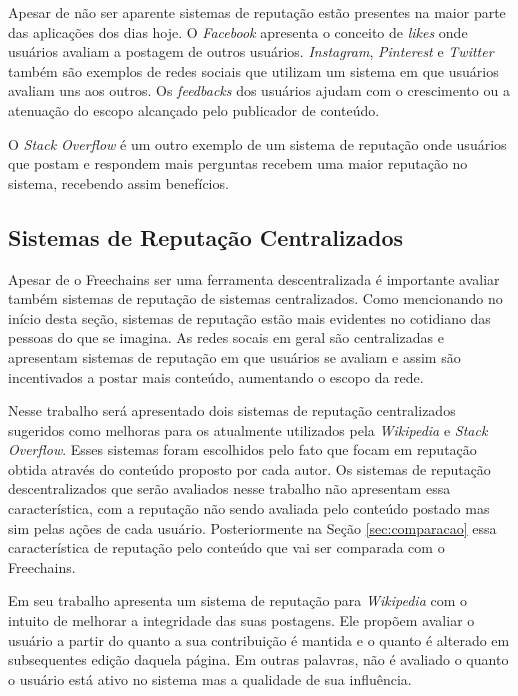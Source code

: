 \documentclass[12pt]{article}
\newcommand{\FC} {Freechains\xspace}
\begin{document}
Apesar de não ser aparente sistemas de reputação estão presentes na maior parte das aplicações dos dias hoje. O \emph{Facebook} apresenta o conceito de \emph{likes} onde usuários avaliam a postagem de outros usuários. \emph{Instagram}, \emph{Pinterest} e \emph{Twitter} também são exemplos de redes sociais que utilizam um sistema em que usuários avaliam uns aos outros. Os \emph{feedbacks} dos usuários ajudam com o crescimento ou a atenuação do escopo alcançado pelo publicador de conteúdo.  

O \emph{Stack Overflow} é um outro exemplo de um sistema de reputação onde usuários que postam e respondem mais perguntas recebem uma maior reputação no sistema, recebendo assim benefícios.

\subsection{Sistemas de Reputação Centralizados} \label{subsec:SRCentra}

Apesar de o \FC ser uma ferramenta descentralizada é importante avaliar também sistemas de reputação de sistemas centralizados. Como mencionando no início desta seção, sistemas de reputação estão mais evidentes no cotidiano das pessoas do que se imagina. As redes socais em geral são centralizadas e apresentam sistemas de reputação em que usuários se avaliam e assim são incentivados a postar mais conteúdo, aumentando o escopo da rede.

Nesse trabalho será apresentado dois sistemas de reputação centralizados sugeridos como melhoras para os atualmente utilizados pela \emph{Wikipedia} e \emph{Stack Overflow}. Esses sistemas foram escolhidos pelo fato que focam em reputação obtida através do conteúdo proposto por cada autor. Os sistemas de reputação descentralizados que serão avaliados nesse trabalho não apresentam essa característica, com a reputação não sendo avaliada pelo conteúdo postado mas sim pelas ações de cada usuário. Posteriormente na Seção \ref{sec:comparacao} essa característica de reputação pelo conteúdo que vai ser comparada com o \FC. 

Em seu trabalho \cite{adler2007content} apresenta um sistema de reputação para \emph{Wikipedia} com o intuito de melhorar a integridade das suas postagens. Ele propõem avaliar o usuário a partir do quanto a sua contribuição é mantida e o quanto é alterado em subsequentes edição daquela página. Em outras palavras, não é avaliado o quanto o usuário está ativo no sistema mas a qualidade de sua influência. 
\end{document}
